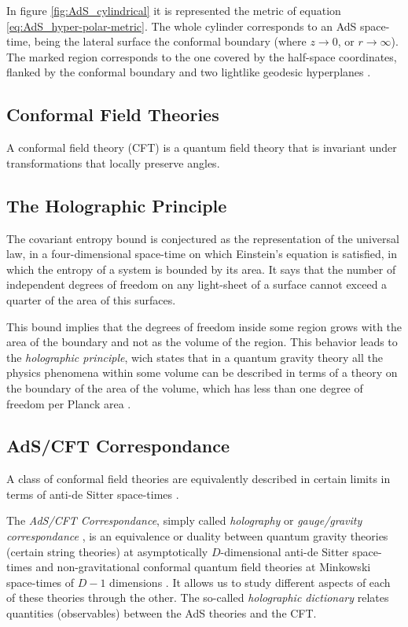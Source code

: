 \documentclass[lettersize,journal]{IEEEtran}
\begin{document}
In figure \ref{fig:AdS_cylindrical} it is represented the metric of equation \ref{eq:AdS_hyper-polar-metric}. The whole cylinder corresponds to an AdS space-time, being the lateral surface the conformal boundary (where $z \to 0$, or $r \to \infty$). The marked region corresponds to the one covered by the half-space coordinates, flanked by the conformal boundary and two lightlike geodesic hyperplanes \cite{}.


\subsection{Conformal Field Theories} \label{ss:CFT}

A conformal field theory (CFT) is a quantum field theory that is invariant under transformations that locally preserve angles.


\subsection{The Holographic Principle} \label{ss:Holography}

The covariant entropy bound \cite{bousso_covariant_1999} is conjectured as the representation of the universal law, in a four-dimensional space-time on which Einstein’s equation is satisfied, in which the entropy of a system is bounded by its area. It says that the number of independent degrees of freedom on any light-sheet of a surface cannot exceed a quarter of the area of this surfaces.

This bound implies that the degrees of freedom inside some region grows with the area of the boundary and not as the volume of the region. This behavior leads to the \textit{holographic principle}, wich states that in a quantum gravity theory all the physics phenomena within some volume can be described in terms of a theory on the boundary of the area of the volume, which has less than one degree of freedom per Planck area \cite{t_hooft_dimensional_2009}.


\subsection{AdS/CFT Correspondance} \label{ss:AdS/CFT}

A class of conformal field theories are equivalently described in certain limits in terms of anti-de Sitter space-times \cite{rangamani_holographic_2017}.

The \textit{AdS/CFT Correspondance}, simply called \textit{holography} or \textit{gauge/gravity correspondance} \cite{ramallo_introduction_2013}, is an equivalence or duality between quantum gravity theories (certain string theories) at asymptotically $D$-dimensional anti-de Sitter space-times and non-gravitational conformal quantum field theories at Minkowski space-times of $D-1$ dimensions \cite{maldacena_large_1999}. It allows us to study different aspects of each of these theories through the other. The so-called \textit{holographic dictionary} relates quantities (observables) between the AdS theories and the CFT. %
\end{document}
